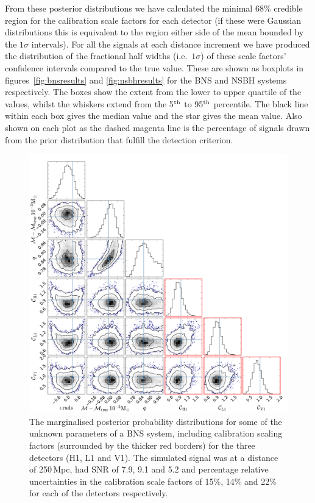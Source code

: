 \documentclass[prd, twocolumn, lengthcheck, superscriptaddress, showpacs, letterpaper, nofootinbib]{revtex4-1}
\begin{document}
From these posterior distributions we have calculated the minimal 68\% credible
region for the calibration scale factors for each detector (if these were
Gaussian distributions this is equivalent to the region either side of the mean
bounded by the $1\sigma$ intervals). For all the signals at each distance
increment we have produced the distribution of the fractional half widths
(i.e.\ $1\sigma$) of these scale factors' confidence intervals compared to the
true value. These are shown as boxplots in figures~\ref{fig:bnsresults} and
\ref{fig:nsbhresults} for the \ac{BNS} and \ac{NSBH} systems respectively. The
boxes show the extent from the lower to upper quartile of the values, whilst
the whiskers extend from the 5$^{\rm th}$ to 95$^{\rm th}$ percentile. The
black line within each box gives the median value and the star gives the mean
value. Also shown on each plot as the dashed magenta line is the percentage of
signals drawn from the prior distribution that fulfill the detection criterion.

\begin{figure}
 \begin{center}
  \includegraphics[width=1.0\textwidth]{bns_post_fig.pdf}
 \end{center}
 \caption{\label{fig:bnspost} The marginalised posterior probability distributions for some of the unknown
 parameters of a \ac{BNS} system, including calibration scaling factors (surrounded by the 
thicker red 
borders) for the three detectors (H1, L1 and V1). The simulated signal was at a distance of 
250\,Mpc, had \ac{SNR} of 7.9, 9.1 and 5.2 and percentage relative uncertainties in the calibration 
scale factors of 15\%, 14\% and 22\% for each of the detectors respectively.}
\end{figure}
\end{document}
